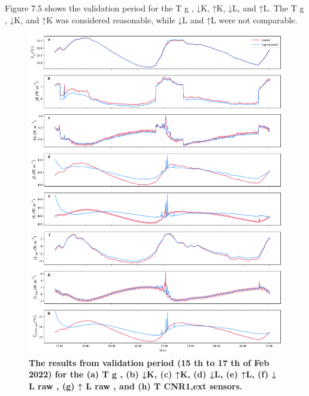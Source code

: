 \documentclass[final,3p,times,authoryear]{elsarticle}
\begin{document}
Figure 7.5 shows the validation period for the T g , ↓K, ↑K, ↓L, and ↑L. The T g , ↓K, and
↑K was considered reasonable, while ↓L and ↑L were not comparable.

\begin{figure}
\centering
\includegraphics[trim={0 0 0 0},clip,scale=1.0]{pict020.png}
\caption{\bf The results from validation period (15 th to 17 th of Feb 2022) for the (a) T g , (b) ↓K, (c) ↑K, (d)
↓L, (e) ↑L, (f) ↓ L raw , (g) ↑ L raw , and (h) T CNR1,ext sensors.}
 \label{fig:7.5}
\end{figure}
\end{document}
